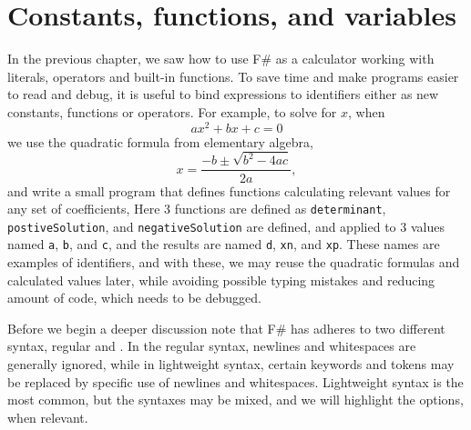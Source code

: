 \chapter{Constants, functions, and variables}
\label{chap:let}
%
In the previous chapter, we saw how to use F\# as a calculator working with literals, operators and built-in functions. To save time and make programs easier to read and debug, it is useful to bind expressions to identifiers either as new constants, functions or operators. For example, to solve for  $x$, when
\begin{equation}
  a x^2+bx+c = 0
\end{equation}
we use the quadratic formula from elementary algebra,
\begin{equation}
  x = \frac{-b\pm\sqrt{b^2-4ac}}{2a},
\end{equation}
and write a small program that defines functions calculating relevant values for any set of coefficients,
%
%
Here 3 functions are defined as \lstinline!determinant!, \lstinline!postiveSolution!, and \lstinline!negativeSolution! are defined, and applied to 3 values named \lstinline!a!, \lstinline!b!, and \lstinline!c!, and the results are named \lstinline!d!, \lstinline!xn!, and \lstinline!xp!. These names are examples of identifiers, and with these, we may reuse the quadratic formulas and calculated values later, while avoiding possible typing mistakes and reducing amount of code, which needs to be debugged.

Before we begin a deeper discussion note that F\# has adheres to two different syntax, regular and . In the regular syntax, newlines and whitespaces are generally ignored, while in lightweight syntax, certain keywords and tokens may be replaced by specific use of newlines and whitespaces. Lightweight syntax is the most common, but the syntaxes may be mixed, and we will highlight the options, when relevant.

